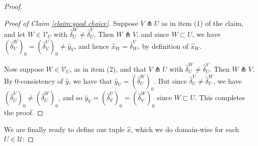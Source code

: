 \documentclass{amsart}
\theoremstyle{definition}
\theoremstyle{remark}
\theoremstyle{definition}
\newcommand{\calU}{\mathcal{U}}
\newcommand{\calV}{\mathcal{V}}
\newcommand{\hx}{\hat{x}}
\newcommand{\hy}{\hat{y}}
\newcommand{\hd}{\hat{\delta}}
\newcommand{\nest}{\sqsubset}
\begin{document}
\begin{proof}
\begin{proof}[Proof of Claim \ref{claim:good choice}]
Suppose $V \pitchfork U$ as in item (1) of the claim, and let $W \in \calV_U$ with $\hd^W_U \neq \hd^V_U$.  Then $W \pitchfork V$, and since $W \nest U$, we have $(\hd^W_V)_0 = (\hd^U_V)_0 \neq \hy_V$, and hence $\hx_W = \hd^V_W$, by definition of $\hx_W$.

Now suppose $W \in \calV_U$, as in item (2), and that $V \pitchfork U$ with $\hd^W_U \neq \hd^V_U$. Then $W \pitchfork V$.  By $0$-consistency of $\hy$, we have that $\hy_U = (\hd^W_U)_0$.  But since $\hd^V_U \neq \hd^W_U$, we have $(\hd^V_U)_0 \neq (\hd^W_U)_0$, and so $\hy_V = (\hd^U_V)_0 = (\hd^W_V)_0$ since $W \nest U$.  This completes the proof.
\end{proof}

We are finally ready to define our tuple $\hx$, which we do domain-wise for each $U \in \calU$:


\end{proof}
\end{document}
